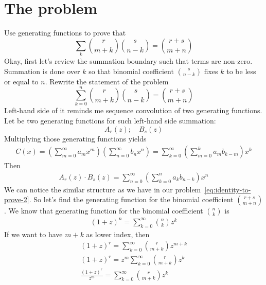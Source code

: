 ﻿\documentclass{article}
\begin{document}
    \section{The problem}\label{sec:the-problem}
    Use generating functions to prove that
    \begin{equation}
        \sum_{k} \binom{r}{m+k} \binom{s}{n-k} = \binom{r+s}{m+n}
        \label{eq:identity-to-prove}
    \end{equation}
    Okay, first let's review the summation boundary such that terms are non-zero.
    Summation is done over $k$ so that binomial coefficient $\binom{s}{n-k}$ fixes $k$ to be less or equal to $n$.
    Rewrite the statement of the problem
    \begin{equation}
        \sum_{k=0}^{n} \binom{r}{m+k} \binom{s}{n-k} = \binom{r+s}{m+n}
        \label{eq:identity-to-prove-2}
    \end{equation}
    Left-hand side of it reminds me sequence convolution of two generating functions.
    Let be two generating functions for such left-hand side summation:
    \begin{equation*}
        A_r(z); \quad B_s(z)
    \end{equation*}
    Multiplying those generating functions yields
    \begin{align*}
        C(x) = \left(\sum_{m=0}^{\infty} a_m x^m\right) \left(\sum_{n=0}^{\infty} b_n x^n\right) = \sum_{k=0}^{\infty} \left( \sum_{m=0}^{k} a_m b_{k-m} \right) x^k
    \end{align*}
    Then
    \begin{align*}
        A_r(z) \cdot B_s(z) = \sum_{n=0}^{\infty} \left( \sum_{k=0}^{n} a_k b_{n-k} \right) x^n
    \end{align*}
    We can notice the similar structure as we have in our problem~\eqref{eq:identity-to-prove-2}.
    So let's find the generating function for the binomial coefficient $\binom{r+s}{m+n}$.
    We know that generating function for the binomial coefficient $\binom{n}{k}$ is
    \begin{align*}
    (1+z)
        ^{n} = \sum_{k=0}^{\infty} \binom{n}{k} z^k
    \end{align*}
    If we want to have $m+k$ as lower index, then
    \begin{align*}
    (1+z)
        ^{r} = \sum_{k=0}^{\infty} \binom{r}{m+k} z^{m+k} \\
        (1+z)^{r} = z^m \sum_{k=0}^{\infty} \binom{r}{m+k} z^{k} \\
        \frac{(1+z)^{r}}{z^m} = \sum_{k=0}^{\infty} \binom{r}{m+k} z^{k}
    \end{align*}
\end{document}
